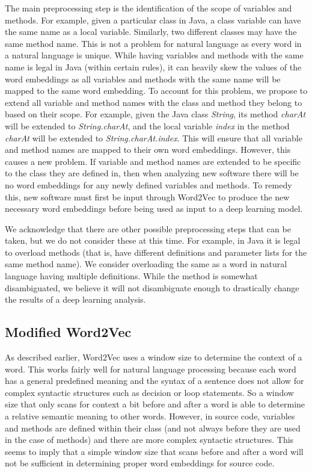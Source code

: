 The main preprocessing step is the identification of the scope of variables and methods. For example, given a particular class in Java, a class variable can have the same name as a local variable. Similarly, two different classes may have the same method name. This is not a problem for natural language as every word in a natural language is unique. While having variables and methods with the same name is legal in Java (within certain rules), it can heavily skew the values of the word embeddings as all variables and methods with the same name will be mapped to the same word embedding. To account for this problem, we propose to extend all variable and method names with the class and method they belong to based on their scope. For example, given the Java class \textit{String}, its method \textit{charAt} will be extended to \textit{String.charAt}, and the local variable \textit{index} in the method \textit{charAt} will be extended to \textit{String.charAt.index}. This will ensure that all variable and method names are mapped to their own word embeddings. However, this causes a new problem. If variable and method names are extended to be specific to the class they are defined in, then when analyzing new software there will be no word embeddings for any newly defined variables and methods. To remedy this, new software must first be input through Word2Vec to produce the new necessary word embeddings before being used as input to a deep learning model.

We acknowledge that there are other possible preprocessing steps that can be taken, but we do not consider these at this time. For example, in Java it is legal to overload methods (that is, have different definitions and parameter lists for the same method name). We consider overloading the same as a word in natural language having multiple definitions. While the method is somewhat disambiguated, we believe it will not disambiguate enough to drastically change the results of a deep learning analysis.

\subsection{Modified Word2Vec}

As described earlier, Word2Vec uses a window size to determine the context of a word. This works fairly well for natural language processing because each word has a general predefined meaning and the syntax of a sentence does not allow for complex syntactic structures such as decision or loop statements. So a window size that only scans for context a bit before and after a word is able to determine a relative semantic meaning to other words. However, in source code, variables and methods are defined within their class (and not always before they are used in the case of methods) and there are more complex syntactic structures. This seems to imply that a simple window size that scans before and after a word will not be sufficient in determining proper word embeddings for source code.

